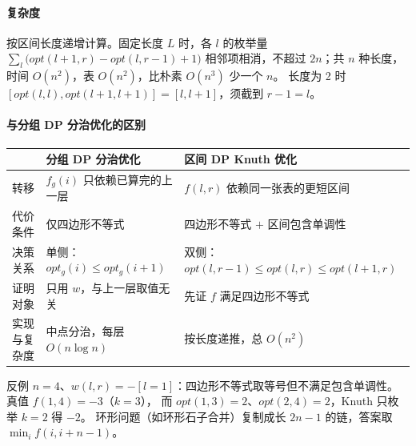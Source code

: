 \paragraph{复杂度} 按区间长度递增计算。固定长度 $L$ 时，各 $l$ 的枚举量
$\sum_l\bigl(opt(l+1,r)-opt(l,r-1)+1\bigr)$ 相邻项相消，不超过 $2n$；共 $n$ 种长度，时间 $O(n^2)$，表 $O(n^2)$，比朴素 $O(n^3)$ 少一个 $n$。
长度为 2 时 $[opt(l,l),opt(l+1,l+1)]=[l,l+1]$，须截到 $r-1=l$。

\paragraph{与分组 DP 分治优化的区别}
\begin{center}\small
\begin{tabular}{@{}lll@{}}
\toprule
& 分组 DP 分治优化 & 区间 DP Knuth 优化\\
\midrule
转移 & $f_g(i)$ 只依赖已算完的上一层 & $f(l,r)$ 依赖同一张表的更短区间\\
代价条件 & 仅四边形不等式 & 四边形不等式 $+$ 区间包含单调性\\
决策关系 & 单侧：$opt_g(i)\le opt_g(i+1)$ & 双侧：$opt(l,r-1)\le opt(l,r)\le opt(l+1,r)$\\
证明对象 & 只用 $w$，与上一层取值无关 & 先证 $f$ 满足四边形不等式\\
实现与复杂度 & 中点分治，每层 $O(n\log n)$ & 按长度递推，总 $O(n^2)$\\
\bottomrule
\end{tabular}
\end{center}
反例 $n=4$、$w(l,r)=-[l=1]$：四边形不等式取等号但不满足包含单调性。真值 $f(1,4)=-3$（$k=3$），
而 $opt(1,3)=2$、$opt(2,4)=2$，Knuth 只枚举 $k=2$ 得 $-2$。
环形问题（如环形石子合并）复制成长 $2n-1$ 的链，答案取 $\min_i f(i,i+n-1)$。
